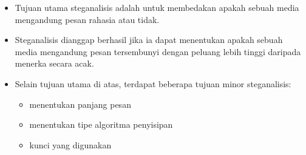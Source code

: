 \documentclass{article}
\begin{document}

\begin{itemize}
  \item Tujuan utama steganalisis adalah untuk membedakan apakah sebuah media mengandung pesan rahasia atau tidak.
  \item Steganalisis dianggap berhasil jika ia dapat menentukan apakah sebuah media mengandung pesan tersembunyi dengan peluang lebih tinggi daripada menerka secara acak.
  \item Selain tujuan utama di atas, terdapat beberapa tujuan minor steganalisis:
  \begin{itemize}
    \item menentukan panjang pesan
    \item menentukan tipe algoritma penyisipan
    \item kunci yang digunakan
  \end{itemize}
\end{itemize}
\end{document}

